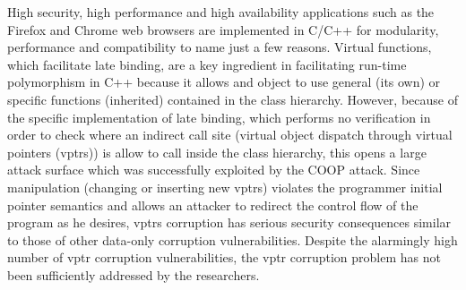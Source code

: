 
% 



High security, high performance and high availability 
applications such as the Firefox and Chrome web browsers 
are implemented in C/C++ for modularity, performance and 
compatibility to name just a few reasons.
Virtual functions, which facilitate late binding,
are a key ingredient in facilitating run-time polymorphism
in C++ because it allows and object to use general (its own) 
or specific functions (inherited) contained in the class hierarchy.
However, because of the specific implementation of late binding,
which performs no verification in order to check where an indirect call site 
(virtual object dispatch through virtual pointers (vptrs)) is allow to
call inside the class hierarchy, this opens a large attack surface which
was successfully exploited by the COOP attack.
Since manipulation (changing or inserting new vptrs) violates the 
programmer initial pointer semantics and allows an attacker to
redirect the control flow of the program as he desires, vptrs corruption
has serious security consequences similar to those of other 
data-only corruption vulnerabilities.
Despite the alarmingly high number of vptr corruption
vulnerabilities, the vptr corruption problem has not
been sufficiently addressed by the researchers.

